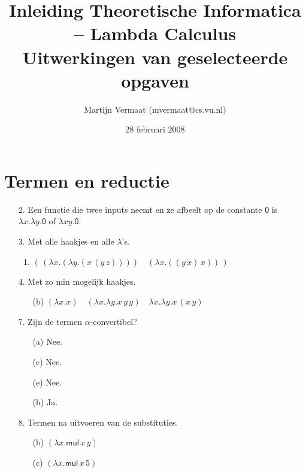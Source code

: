 \documentclass[a4paper,11pt]{article}
\title{Inleiding Theoretische Informatica -- Lambda Calculus\\
\normalsize{Uitwerkingen van geselecteerde opgaven}}
\author{Martijn Vermaat (mvermaat@cs.vu.nl)}
\date{28 februari 2008}
\begin{document}
\maketitle


\section{Termen en reductie}


\begin{enumerate}


\item[2.]
Een functie die twee inputs neemt en ze afbeelt op de constante $\textsf{0}$ is
$\lambda x. \lambda y. \textsf{0}$ of $\lambda xy. \textsf{0}$.


\item[3.]
Met alle haakjes en alle $\lambda$'s.
\begin{enumerate}

\item
$( \, (\lambda x. (\lambda y. (x \, (y \, z)))) \quad (\lambda x. ((y \, x) \, x)) \, )$

\end{enumerate}


\item[4.]
Met zo min mogelijk haakjes.
\begin{enumerate}

\item[(b)]
$(\lambda x. x) \quad (\lambda x. \lambda y. x \, y \, y) \quad \lambda x. \lambda y. x \, (x \, y)$

\end{enumerate}


\item[7.]
Zijn de termen $\alpha$-convertibel?
\begin{enumerate}

\item[(a)] Nee.
\item[(c)] Nee.
\item[(e)] Nee.
\item[(h)] Ja.

\end{enumerate}


\item[8.]
Termen na uitvoeren van de substituties.
\begin{enumerate}

\item[(b)] $(\lambda x. \textsf{mul} \, x \, y)$

\item[(c)] $(\lambda x. \textsf{mul} \, x \, 5)$


\end{enumerate}
\end{enumerate}
\end{document}

